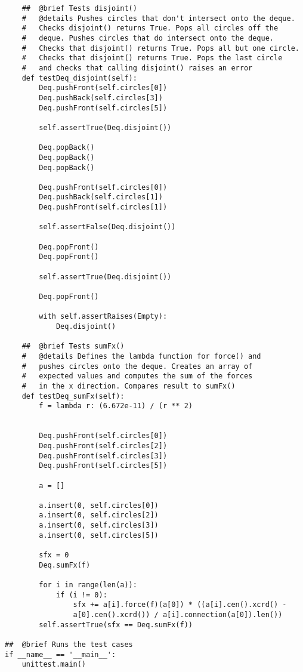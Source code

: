 \documentclass{article}
\begin{document}
\begin{lstlisting}
    ##  @brief Tests disjoint()
    #   @details Pushes circles that don't intersect onto the deque. 
    #   Checks disjoint() returns True. Pops all circles off the 
    #   deque. Pushes circles that do intersect onto the deque. 
    #   Checks that disjoint() returns True. Pops all but one circle. 
    #   Checks that disjoint() returns True. Pops the last circle 
    #   and checks that calling disjoint() raises an error
    def testDeq_disjoint(self):
        Deq.pushFront(self.circles[0])
        Deq.pushBack(self.circles[3])
        Deq.pushFront(self.circles[5])

        self.assertTrue(Deq.disjoint())

        Deq.popBack()
        Deq.popBack()
        Deq.popBack()

        Deq.pushFront(self.circles[0])
        Deq.pushBack(self.circles[1])
        Deq.pushFront(self.circles[1])

        self.assertFalse(Deq.disjoint())

        Deq.popFront()
        Deq.popFront()

        self.assertTrue(Deq.disjoint())

        Deq.popFront()

        with self.assertRaises(Empty):
            Deq.disjoint()

    ##  @brief Tests sumFx()
    #   @details Defines the lambda function for force() and
    #   pushes circles onto the deque. Creates an array of 
    #   expected values and computes the sum of the forces 
    #   in the x direction. Compares result to sumFx()
    def testDeq_sumFx(self):
        f = lambda r: (6.672e-11) / (r ** 2)

        
        Deq.pushFront(self.circles[0])
        Deq.pushFront(self.circles[2])
        Deq.pushFront(self.circles[3])
        Deq.pushFront(self.circles[5])

        a = []

        a.insert(0, self.circles[0])
        a.insert(0, self.circles[2])
        a.insert(0, self.circles[3])
        a.insert(0, self.circles[5])

        sfx = 0
        Deq.sumFx(f)
        
        for i in range(len(a)):
            if (i != 0):
                sfx += a[i].force(f)(a[0]) * ((a[i].cen().xcrd() -
                a[0].cen().xcrd()) / a[i].connection(a[0]).len())
        self.assertTrue(sfx == Deq.sumFx(f))
        
##  @brief Runs the test cases
if __name__ == '__main__':
    unittest.main()

\end{lstlisting}
\end{document}
